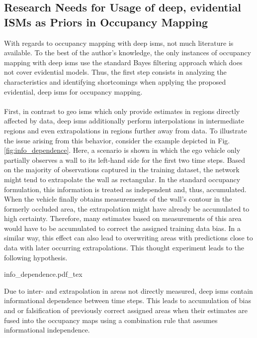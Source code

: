 \subsection{Research Needs for Usage of deep, evidential ISMs as Priors in Occupancy Mapping}
\label{subsec:research_needs_for_usage_of_deep_ims_as_priors_in_occmapping}
With regards to occupancy mapping with deep \gls{ism}s, not much literature is available. To the best of the author's knowledge, the only instances of occupancy mapping with deep \gls{ism}s use the standard Bayes filtering approach which does not cover evidential models. Thus, the first step consists in analyzing the characteristics and identifying shortcomings when applying the proposed evidential, deep \gls{ism}s for occupancy mapping.
\\\\
First, in contrast to geo \gls{ism}s which only provide estimates in regions directly affected by data, deep \gls{ism}s additionally perform interpolations in intermediate regions and even extrapolations in regions further away from data. To illustrate the issue arising from this behavior, consider the example depicted in Fig. \ref{fig:info_dependence}. Here, a scenario is shown in which the ego vehicle only partially observes a wall to its left-hand side for the first two time steps. Based on the majority of observations captured in the training dataset, the network might tend to extrapolate the wall as rectangular. In the standard occupancy formulation, this information is treated as independent and, thus, accumulated. When the vehicle finally obtains measurements of the wall's contour in the formerly occluded area, the extrapolation might have already be accumulated to high certainty. Therefore, many estimates based on measurements of this area would have to be accumulated to correct the assigned training data bias. In a similar way, this effect can also lead to overwriting areas with predictions close to data with later occurring extrapolations. This thought experiment leads to the following hypothesis.
\begin{center}
	{info_dependence.pdf_tex}
\end{center}
\begin{hyp} \label{hyp:temporal_dependence}
	Due to inter- and extrapolation in areas not directly measured, deep \gls{ism}s contain informational dependence between time steps. This leads to accumulation of bias and or falsification of previously correct assigned areas when their estimates are fused into the occupancy maps using a combination rule that assumes informational independence.  
\end{hyp}
